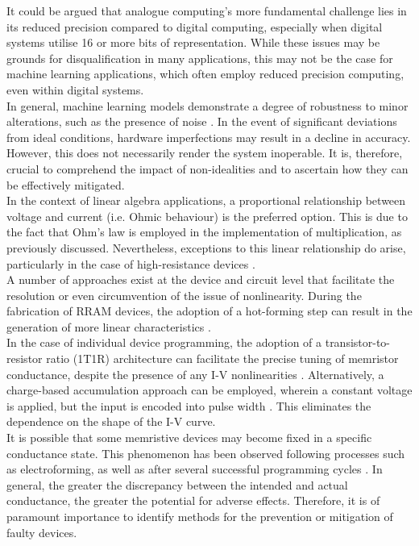\noindent It could be argued that analogue computing's more fundamental challenge lies in its reduced precision compared to digital computing, especially when digital systems utilise 16 or more bits of representation. While these issues may be grounds for disqualification in many applications, this may not be the case for machine learning applications, which often employ reduced precision computing, even within digital systems. \\

\noindent In general, machine learning models demonstrate a degree of robustness to minor alterations, such as the presence of noise \cite{cheney2017robustness}. In the event of significant deviations from ideal conditions, hardware imperfections may result in a decline in accuracy. However, this does not necessarily render the system inoperable. It is, therefore, crucial to comprehend the impact of non-idealities and to ascertain how they can be effectively mitigated. \\

\noindent In the context of linear algebra applications, a proportional relationship between voltage and current (i.e. Ohmic behaviour) is the preferred option. This is due to the fact that Ohm's law is employed in the implementation of multiplication, as previously discussed. Nevertheless, exceptions to this linear relationship do arise, particularly in the case of high-resistance devices \cite{mehonic2017intrinsic}. \\

\noindent A number of approaches exist at the device and circuit level that facilitate the resolution or even circumvention of the issue of nonlinearity. During the fabrication of RRAM devices, the adoption of a hot-forming step can result in the generation of more linear characteristics \cite{sung2018effect}. \\

\noindent In the case of individual device programming, the adoption of a transistor-to-resistor ratio (1T1R) architecture can facilitate the precise tuning of memristor conductance, despite the presence of any I-V nonlinearities \cite{li2018analogue}. Alternatively, a charge-based accumulation approach can be employed, wherein a constant voltage is applied, but the input is encoded into pulse width \cite{amirsoleimani2020memory}. This eliminates the dependence on the shape of the I-V curve. \\

\noindent It is possible that some memristive devices may become fixed in a specific conductance state. This phenomenon has been observed following processes such as electroforming, as well as after several successful programming cycles \cite{joksas2022nonideality}. In general, the greater the discrepancy between the intended and actual conductance, the greater the potential for adverse effects. Therefore, it is of paramount importance to identify methods for the prevention or mitigation of faulty devices.\\

